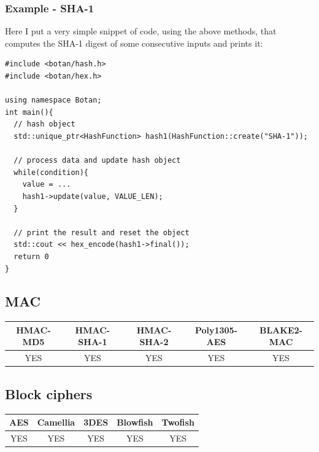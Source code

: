 \subsubsection*{Example - SHA-1}
Here I put a very simple snippet of code, using the above methods, that computes the SHA-1 digest of some consecutive inputs and prints it:
\begin{verbatim}
#include <botan/hash.h>
#include <botan/hex.h>

using namespace Botan;
int main(){
  // hash object
  std::unique_ptr<HashFunction> hash1(HashFunction::create("SHA-1"));
  
  // process data and update hash object
  while(condition){
    value = ...
    hash1->update(value, VALUE_LEN);
  }
  
  // print the result and reset the object
  std::cout << hex_encode(hash1->final());
  return 0
}
\end{verbatim}

\newpage
\subsection{MAC}
\begin{table}[!ht]
	\begin{tabular}{|| c | c | c | c | c ||}
		\textbf{HMAC-MD5} & \textbf{HMAC-SHA-1} & \textbf{HMAC-SHA-2} & \textbf{Poly1305-AES} & \textbf{BLAKE2-MAC} \\
		\hline \hline
		YES & YES & YES & YES & YES \\
	\end{tabular}
\end{table}

\subsection{Block ciphers}
\begin{table}[!h]
	\begin{tabular}{|| c | c | c | c | c ||}
		\textbf{AES} & \textbf{Camellia} & \textbf{3DES} & \textbf{Blowfish} & \textbf{Twofish} \\
		\hline \hline
		YES & YES & YES & YES & YES \\
	\end{tabular}
\end{table}

